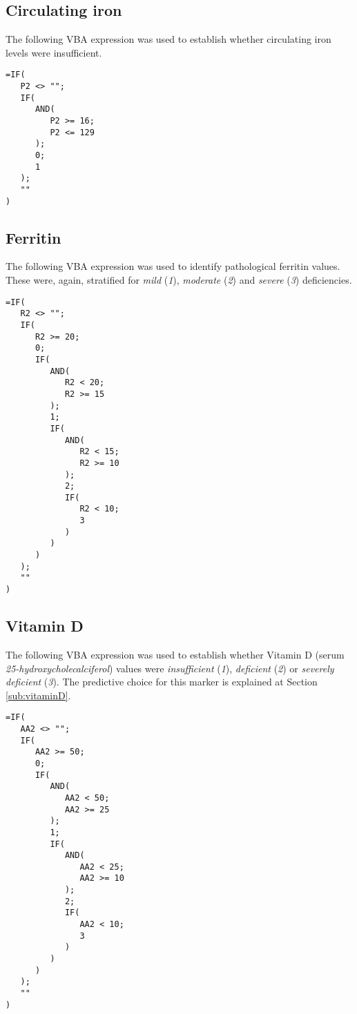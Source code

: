 \subsection{Circulating iron}\label{sub:patiron}
The following VBA expression was used to establish whether circulating iron levels were insufficient. 

\begin{minipage}{\linewidth}
\begin{lstlisting}
=IF(
   P2 <> "";
   IF(
      AND(
         P2 >= 16;
         P2 <= 129
      );
      0;
      1
   );
   ""
)
\end{lstlisting}
\end{minipage}

\subsection{Ferritin}\label{sub:patferritin}
The following VBA expression was used to identify pathological ferritin values. These were, again, stratified for \textit{mild} (\textit{1}), \textit{moderate} (\textit{2}) and \textit{severe} (\textit{3}) deficiencies. 

\begin{lstlisting}
=IF(
   R2 <> "";
   IF(
      R2 >= 20;
      0;
      IF(
         AND(
            R2 < 20;
            R2 >= 15
         );
         1;
         IF(
            AND(
               R2 < 15;
               R2 >= 10
            );
            2;
            IF(
               R2 < 10;
               3
            )
         )
      )
   );
   ""
)
\end{lstlisting}

\subsection{Vitamin D}\label{sub:patvitaminD}
The following VBA expression was used to establish whether Vitamin D (serum \textit{25-hydroxycholecalciferol}) values were \textit{insufficient} (\textit{1}), \textit{deficient} (\textit{2}) or \textit{severely deficient} (\textit{3}). The predictive choice for this marker is explained at Section \ref{sub:vitaminD}.

\begin{lstlisting}
=IF(
   AA2 <> "";
   IF(
      AA2 >= 50;
      0;
      IF(
         AND(
            AA2 < 50;
            AA2 >= 25
         );
         1;
         IF(
            AND(
               AA2 < 25;
               AA2 >= 10
            );
            2;
            IF(
               AA2 < 10;
               3
            )
         )
      )
   );
   ""
)
\end{lstlisting}